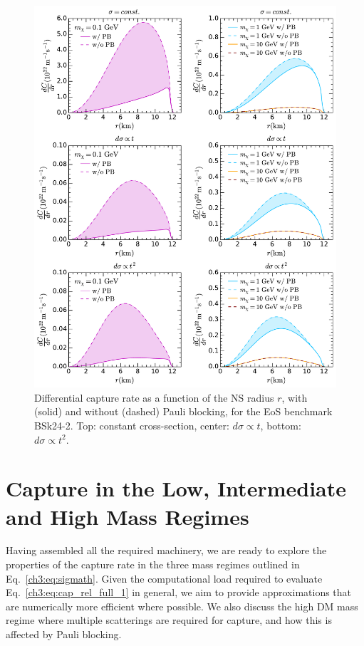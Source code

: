 \begin{figure}
    \centering
    \includegraphics[width=.85\textwidth]{capture_1/diff_cap_rate.pdf}        
    \caption{Differential capture rate as a function of the NS radius $r$, with (solid) and without (dashed) Pauli blocking, for the EoS benchmark BSk24-2. Top: constant cross-section, center: $d\sigma\propto t$, bottom: $d\sigma\propto t^2$.}
    \label{ch3:fig:diffcap}
\end{figure}

\section{Capture in the Low, Intermediate and High Mass Regimes}
\label{ch3:sec:capture_analysis}

Having assembled all the required machinery, we are ready to explore the properties of the capture rate in the three mass regimes outlined in Eq.~\ref{ch3:eq:sigmath}.  Given the computational load required to evaluate Eq.~\ref{ch3:eq:cap_rel_full_1} in general, we aim to provide approximations that are numerically more efficient where possible. We also discuss the high DM mass regime where multiple scatterings are required for capture, and how this is affected by Pauli blocking. 


